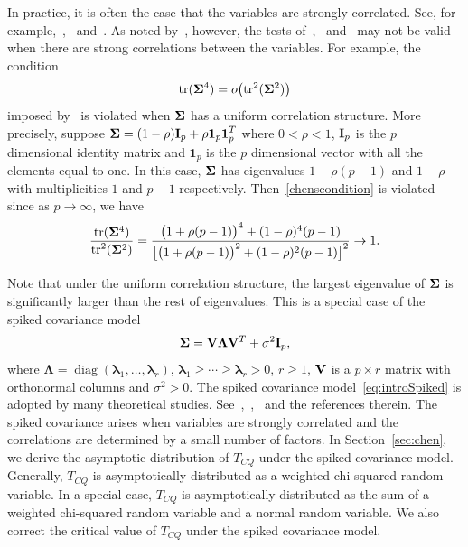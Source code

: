 \documentclass[review]{elsarticle}
\DeclareMathOperator{\mytr}{tr}
\DeclareMathOperator{\mydiag}{diag}
\newcommand{\bfsym}[1]{\ensuremath{\boldsymbol{#1}}}
\def\blambda {\bfsym {\lambda}}        \def\bLambda {\bfsym {\Lambda}}
\theoremstyle{plain}
\theoremstyle{definition}
\theoremstyle{remark}
\begin{document}
In practice, it is often the case that the variables are strongly correlated.
See, for example,~\cite{Chen2011A},~\cite{Thulin2014A} and~\cite{Ma2015A}.
As noted by~\cite{Ma2015A}, however, the tests of~\cite{Bai1996Efiect},~\cite{Srivastava2008A} and~\cite{Chen2010A} may not be valid when there are strong correlations between the variables.
For example, the condition 
\begin{equation}\label{chenscondition}
    \mathrm{tr}(\bSigma^4)=o\big(\mathrm{tr}^2(\bSigma^2)\big)
\end{equation}
imposed by~\cite{Chen2010A} is violated when $\bSigma$ has a uniform correlation structure.
More precisely, suppose
$\bSigma=(1-\rho)\BI_p+\rho\textbf{1}_p \textbf{1}_p^T$ where $0<\rho<1$, $\mathbf{I}_p$ is the $p$ dimensional identity matrix and $\bm{1}_p$ is the $p$ dimensional vector with all the elements equal to one.
In this case, $\bSigma$ has eigenvalues $1+\rho(p-1) $ and $1-\rho$ with multiplicities $1$ and $p-1$ respectively. Then~\eqref{chenscondition} is violated since 
as $p\to \infty$, we have
$$
\frac{\mytr (\bSigma^4)}{\mytr^2(\bSigma^2)}=\frac{\big(1+\rho(p-1)\big)^4 + (1-\rho)^4 (p-1)}{\big[ \big(1+\rho(p-1)\big)^2+(1-\rho)^2 (p-1) \big]^2}\to 1.
$$

  Note that under the uniform correlation structure, the largest eigenvalue of $\bSigma$ is significantly larger than the rest of eigenvalues.
  This is a special case of the spiked covariance model
 \begin{equation}\label{eq:introSpiked}
 \bSigma =\BV\bLambda \BV^T +\sigma^2 \BI_p,
 \end{equation}
 where $\bLambda=\mydiag(\blambda_1,\ldots,\blambda_r)$, $\blambda_1\geq \cdots\geq \blambda_r>0$, $r\geq 1$, $\mathbf{V}$ is a $p\times r$ matrix with orthonormal columns and $\sigma^2>0$.
The spiked covariance model~\eqref{eq:introSpiked} is adopted by many theoretical studies. See~\cite{Cai2012Sparse},~\cite{Birnbaum2013},~\cite{Passemier2015} and the references therein.
The spiked covariance arises when variables are strongly correlated and the correlations are determined by a small number of factors.
 In Section~\ref{sec:chen}, we derive the asymptotic distribution of $T_{CQ}$ under the spiked covariance model. 
Generally, $T_{CQ}$ is asymptotically distributed as a weighted chi-squared random variable.
In a special case, $T_{CQ}$ is asymptotically distributed as the sum of a weighted chi-squared random variable and a normal random variable. 
We also correct the critical value of $T_{CQ}$ under the spiked covariance model.
\end{document}
